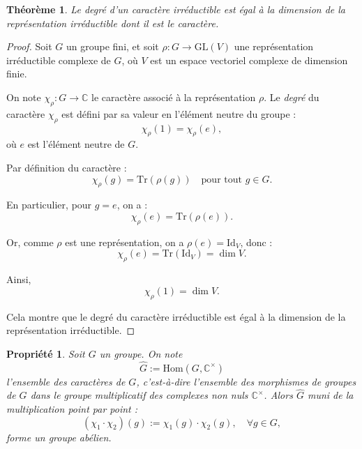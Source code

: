 \documentclass[12pt]{article}
\newtheorem{propriete}{Propriété}
\newtheorem{theoreme}{Théorème}
\begin{document}
	
	
	
	
	\begin{theoreme}
		Le degré d’un caractère irréductible est égal à la dimension de la représentation irréductible dont il est le caractère.
	\end{theoreme}
	
	\begin{proof}
		Soit \( G \) un groupe fini, et soit \( \rho : G \to \mathrm{GL}(V) \) une représentation irréductible complexe de \( G \), où \( V \) est un espace vectoriel complexe de dimension finie.
		
		On note \( \chi_\rho : G \to \mathbb{C} \) le caractère associé à la représentation \( \rho \). Le \emph{degré} du caractère \( \chi_\rho \) est défini par sa valeur en l’élément neutre du groupe :
		\[
		\chi_\rho(1) = \chi_\rho(e),
		\]
		où \( e \) est l’élément neutre de \( G \).
		
		Par définition du caractère :
		\[
		\chi_\rho(g) = \mathrm{Tr}(\rho(g)) \quad \text{pour tout } g \in G.
		\]
		
		En particulier, pour \( g = e \), on a :
		\[
		\chi_\rho(e) = \mathrm{Tr}(\rho(e)).
		\]
		
		Or, comme \( \rho \) est une représentation, on a \( \rho(e) = \mathrm{Id}_V \), donc :
		\[
		\chi_\rho(e) = \mathrm{Tr}(\mathrm{Id}_V) = \dim V.
		\]
		
		Ainsi,
		\[
		\chi_\rho(1) = \dim V.
		\]
		
		Cela montre que le degré du caractère irréductible est égal à la dimension de la représentation irréductible.
		
	\end{proof}
	
		
	\begin{propriete}
		Soit \( G \) un groupe. On note
		\[
		\widehat{G} := \mathrm{Hom}(G, \mathbb{C}^\times)
		\]
		l’ensemble des caractères de \( G \), c’est-à-dire l’ensemble des morphismes de groupes de \( G \) dans le groupe multiplicatif des complexes non nuls \( \mathbb{C}^\times \). Alors \( \widehat{G} \) muni de la multiplication point par point :
		\[
		(\chi_1 \cdot \chi_2)(g) := \chi_1(g) \cdot \chi_2(g), \quad \forall g \in G,
		\]
		forme un groupe abélien.
	\end{propriete}
	
\end{document}
